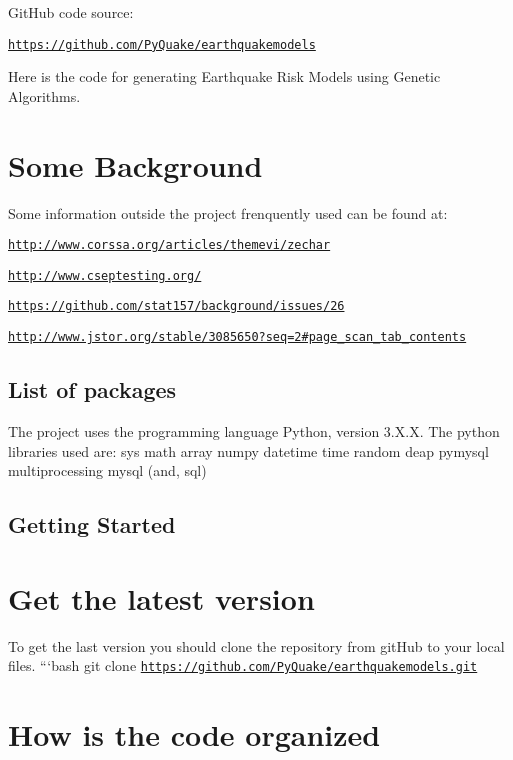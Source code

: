 Git\+Hub code source\+:

\href{https://github.com/PyQuake/earthquakemodels}{\tt https\+://github.\+com/\+Py\+Quake/earthquakemodels}

Here is the code for generating Earthquake Risk Models using Genetic Algorithms.

\section*{Some Background}

Some information outside the project frenquently used can be found at\+:

\href{http://www.corssa.org/articles/themevi/zechar}{\tt http\+://www.\+corssa.\+org/articles/themevi/zechar}

\href{http://www.cseptesting.org/}{\tt http\+://www.\+cseptesting.\+org/}

\href{https://github.com/stat157/background/issues/26}{\tt https\+://github.\+com/stat157/background/issues/26}

\href{http://www.jstor.org/stable/3085650?seq=2#page_scan_tab_contents}{\tt http\+://www.\+jstor.\+org/stable/3085650?seq=2\#page\+\_\+scan\+\_\+tab\+\_\+contents}

\subsection*{List of packages }

The project uses the programming language Python, version 3.\+X.\+X. The python libraries used are\+: sys math array numpy datetime time random deap pymysql multiprocessing mysql (and, sql)

\subsection*{Getting Started }

\section*{Get the latest version}

To get the last version you should clone the repository from git\+Hub to your local files. ```bash git clone \href{https://github.com/PyQuake/earthquakemodels.git}{\tt https\+://github.\+com/\+Py\+Quake/earthquakemodels.\+git}

\section*{How is the code organized}

